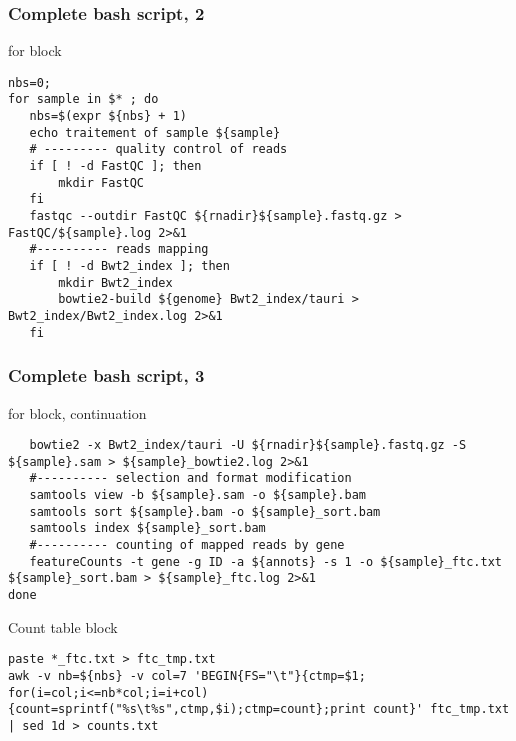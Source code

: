 \begin{frame}[containsverbatim]
\frametitle{Complete bash script, 2}
\begin{exampleblock}{for block}
\begin{lstlisting}
nbs=0;
for sample in $* ; do 
   nbs=$(expr ${nbs} + 1)
   echo traitement of sample ${sample}
   # --------- quality control of reads
   if [ ! -d FastQC ]; then
       mkdir FastQC
   fi
   fastqc --outdir FastQC ${rnadir}${sample}.fastq.gz > FastQC/${sample}.log 2>&1
   #---------- reads mapping
   if [ ! -d Bwt2_index ]; then
       mkdir Bwt2_index
       bowtie2-build ${genome} Bwt2_index/tauri > Bwt2_index/Bwt2_index.log 2>&1
   fi
\end{lstlisting}
\end{exampleblock}
\end{frame}
\begin{frame}[containsverbatim]
\frametitle{Complete bash script, 3}
\begin{exampleblock}{for block, continuation}
\begin{lstlisting}
   bowtie2 -x Bwt2_index/tauri -U ${rnadir}${sample}.fastq.gz -S ${sample}.sam > ${sample}_bowtie2.log 2>&1
   #---------- selection and format modification
   samtools view -b ${sample}.sam -o ${sample}.bam
   samtools sort ${sample}.bam -o ${sample}_sort.bam
   samtools index ${sample}_sort.bam
   #---------- counting of mapped reads by gene
   featureCounts -t gene -g ID -a ${annots} -s 1 -o ${sample}_ftc.txt ${sample}_sort.bam > ${sample}_ftc.log 2>&1
done
\end{lstlisting}
\end{exampleblock}
\begin{exampleblock}{Count table block}
\begin{lstlisting}
paste *_ftc.txt > ftc_tmp.txt
awk -v nb=${nbs} -v col=7 'BEGIN{FS="\t"}{ctmp=$1; for(i=col;i<=nb*col;i=i+col){count=sprintf("%s\t%s",ctmp,$i);ctmp=count};print count}' ftc_tmp.txt | sed 1d > counts.txt
\end{lstlisting}
\end{exampleblock}
\end{frame}
